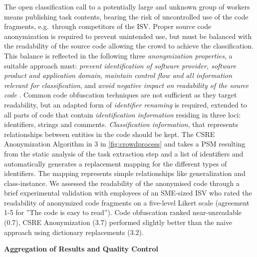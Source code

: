 The open classification call to a potentially large and unknown group of workers \autocite{Latoza2016} means publishing task contents, bearing the risk of uncontrolled use of the code fragments, e.g.~through competitors of the ISV.
Proper source code anonymization is required to prevent unintended use, but must be balanced with the readability of the source code allowing the crowd to achieve the classification.
This balance is reflected in the following three \emph{anonymization properties}, a suitable approach must: \emph{prevent identification of software provider, software product and application domain}, \emph{maintain control flow and all information relevant for classification}, and \emph{avoid negative impact on readability of the source code} \autocite{Heil2018CSRE,Heil2019CSRECCIS}.
Common code obfuscation techniques are not sufficient as they target readability, but an adapted form of \emph{identifier renaming} \autocite{Ceccato2014} is required, extended to all parts of code that contain \emph{identification information} residing in three loci: identifiers, strings and comments.
\emph{Classification information}, that represents relationships between entities in the code should be kept.
The CSRE Anonymization Algorithm \autocite{Heil2019CSRECCIS} in 3 in \cref{fig:crowdprocess} and takes a PSM resulting from the static analysis of the task extraction step and a list of identifiers and automatically generates a replacement mapping for the different types of identifiers.
The mapping represents simple relationships like generalization and class-instance.
We assessed the readability of the anonymised code through a brief experimental validation \autocite{Heil2019CSRECCIS} with employees of an SME-sized ISV who rated the readability of anonymized code fragments on a five-level Likert scale (agreement 1-5 for ''The code is easy to read'').
Code obfuscation ranked near-unreadable (0.7), CSRE Anonymization (3.7) performed slightly better than the naive approach using dictionary replacements (3.2).


\textbf{Aggregation of Results and Quality Control}

